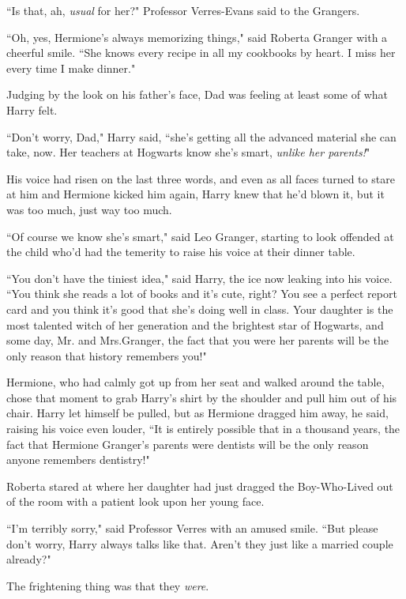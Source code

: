 ``Is that, ah, \emph{usual} for her?" Professor Verres-Evans said to the Grangers.

``Oh, yes, Hermione's always memorizing things," said Roberta Granger with a cheerful smile. ``She knows every recipe in all my cookbooks by heart. I miss her every time I make dinner."

Judging by the look on his father's face, Dad was feeling at least some of what Harry felt.

``Don't worry, Dad," Harry said, ``she's getting all the advanced material she can take, now. Her teachers at Hogwarts know she's smart, \emph{unlike her parents!}"

His voice had risen on the last three words, and even as all faces turned to stare at him and Hermione kicked him again, Harry knew that he'd blown it, but it was too much, just way too much.

``Of course we know she's smart," said Leo Granger, starting to look offended at the child who'd had the temerity to raise his voice at their dinner table.

``You don't have the tiniest idea," said Harry, the ice now leaking into his voice. ``You think she reads a lot of books and it's cute, right? You see a perfect report card and you think it's good that she's doing well in class. Your daughter is the most talented witch of her generation and the brightest star of Hogwarts, and some day, Mr. and Mrs.\?Granger, the fact that you were her parents will be the only reason that history remembers you!"

Hermione, who had calmly got up from her seat and walked around the table, chose that moment to grab Harry's shirt by the shoulder and pull him out of his chair. Harry let himself be pulled, but as Hermione dragged him away, he said, raising his voice even louder, ``It is entirely possible that in a thousand years, the fact that Hermione Granger's parents were dentists will be the only reason anyone remembers dentistry!"

\later

Roberta stared at where her daughter had just dragged the Boy-Who-Lived out of the room with a patient look upon her young face.

``I'm terribly sorry," said Professor Verres with an amused smile. ``But please don't worry, Harry always talks like that. Aren't they just like a married couple already?"

The frightening thing was that they \emph{were}.

\later

